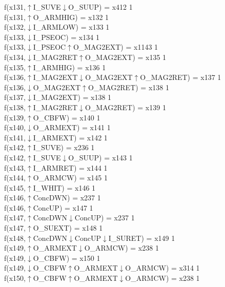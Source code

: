 f(x131,$\uparrow$I\_SUVE$\downarrow$O\_SUUP) = x412 {1} \\
f(x131,$\uparrow$O\_ARMHIG) = x132 {1} \\
f(x132,$\downarrow$I\_ARMLOW) = x133 {1} \\
f(x133,$\downarrow$I\_PSEOC) = x134 {1} \\
f(x133,$\downarrow$I\_PSEOC$\uparrow$O\_MAG2EXT) = x1143 {1} \\
f(x134,$\downarrow$I\_MAG2RET$\uparrow$O\_MAG2EXT) = x135 {1} \\
f(x135,$\uparrow$I\_ARMHIG) = x136 {1} \\
f(x136,$\uparrow$I\_MAG2EXT$\downarrow$O\_MAG2EXT$\uparrow$O\_MAG2RET) = x137 {1} \\
f(x136,$\downarrow$O\_MAG2EXT$\uparrow$O\_MAG2RET) = x138 {1} \\
f(x137,$\downarrow$I\_MAG2EXT) = x138 {1} \\
f(x138,$\uparrow$I\_MAG2RET$\downarrow$O\_MAG2RET) = x139 {1} \\
f(x139,$\uparrow$O\_CBFW) = x140 {1} \\
f(x140,$\downarrow$O\_ARMEXT) = x141 {1} \\
f(x141,$\downarrow$I\_ARMEXT) = x142 {1} \\
f(x142,$\uparrow$I\_SUVE) = x236 {1} \\
f(x142,$\uparrow$I\_SUVE$\downarrow$O\_SUUP) = x143 {1} \\
f(x143,$\uparrow$I\_ARMRET) = x144 {1} \\
f(x144,$\uparrow$O\_ARMCW) = x145 {1} \\
f(x145,$\uparrow$I\_WHIT) = x146 {1} \\
f(x146,$\uparrow$ConcDWN) = x237 {1} \\
f(x146,$\uparrow$ConcUP) = x147 {1} \\
f(x147,$\uparrow$ConcDWN$\downarrow$ConcUP) = x237 {1} \\
f(x147,$\uparrow$O\_SUEXT) = x148 {1} \\
f(x148,$\uparrow$ConcDWN$\downarrow$ConcUP$\downarrow$I\_SURET) = x149 {1} \\
f(x149,$\uparrow$O\_ARMEXT$\downarrow$O\_ARMCW) = x238 {1} \\
f(x149,$\downarrow$O\_CBFW) = x150 {1} \\
f(x149,$\downarrow$O\_CBFW$\uparrow$O\_ARMEXT$\downarrow$O\_ARMCW) = x314 {1} \\
f(x150,$\uparrow$O\_CBFW$\uparrow$O\_ARMEXT$\downarrow$O\_ARMCW) = x238 {1} \\
